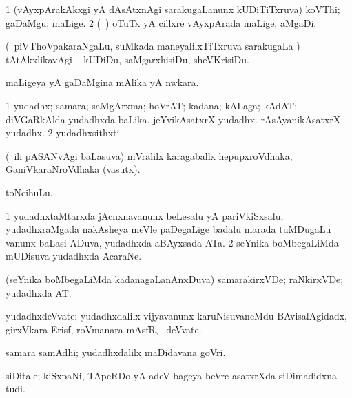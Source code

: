 {\bentry
{} 
\gl{\nA}
\expl{}
\bmng
\bnum
\num{1} (vAyxpArakAkxgi yA dAsAtxnAgi sarakugaLanunx kUDiTiTxruva) koVThi; gaDaMgu; maLige. 
\num{2} (\kanmu\ \birx) oTuTx yA cillxre vAyxpArada maLige, aMgaDi. 
\enum
\emng
\eentry

\bentry
{} 
\gl{\sakirx}
\expl{}
\bmng
(\kanmu\ piVThoVpakaraNgaLu, suMkada maneyalilxTiTxruva sarakugaLa \vi) tAtAkxlikavAgi -- kUDiDu, saMgarxhisiDu, sheVKrisiDu. 
\emng
\eentry

\bentry
{} 
\gl{\nA}
\bmng
maLigeya yA gaDaMgina mAlika yA nwkara. 
\emng
\eentry

\bentry
{} 
\gl{\nA}
\expl{}
\bmng
\bnum
\num{1} yudadhx; samara; saMgArxma; hoVrAT; kadana; kALaga; kAdAT:  diVGaRkAlda yudadhxda baLika.  jeYvikAsatxrX yudadhx.  rAsAyanikAsatxrX yudadhx. 
\num{2} yudadhxsithxti. 
\enum
\emng
\eentry

\bentry
{} 
\gl{\nA}
\expl{}
\bmng
(\kanmu\ ili pASANvAgi baLasuva) niVralilx karagaballx hepupxroVdhaka, GaniVkaraNroVdhaka (vasutx). 
\emng
\eentry

\bentry
{} 
\gl{\nA}
\expl{}
\bmng
toNcihuLu. 
\emng
\eentry

\bentry
{} 
\gl{\nA}
\expl{}
\bmng
\bnum
\num{1} yudadhxtaMtarxda jAcnxnavanunx beLesalu yA pariVkiSxsalu, yudadhxraMgada nakAsheya meVle paDegaLige badalu marada tuMDugaLu \mo vanunx baLasi ADuva, yudadhxda aBAyxsada ATa. 
\num{2} seYnika boMbegaLiMda mUDisuva yudadhxda AcaraNe. 
\enum
\emng
\eentry

\bentry
{} 
\gl{\nA}
\expl{}
\bmng
(seYnika boMbegaLiMda kadanagaLanAnxDuva) samarakirxVDe; raNkirxVDe; yudadhxda AT. 
\emng
\eentry

\bentry
{} 
\gl{\nA}
\expl{}
\bmng
yudadhxdeVvate; yudadhxdalilx vijyavanunx karuNisuvaneMdu BAvisalAgidadx, girxVkara Erisf, roVmanara mAsfR, \mo\ deVvate. 
\emng
\eentry

\bentry
{} 
\gl{\nA}
\expl{}
\bmng
samara samAdhi; yudadhxdalilx maDidavana goVri. 
\emng
\eentry

\bentry
{} 
\gl{\nA}
\expl{}
\bmng
siDitale; kiSxpaNi, TApeRDo yA adeV bageya beVre asatxrXda siDimadidxna tudi. 
\emng
\eentry

}

